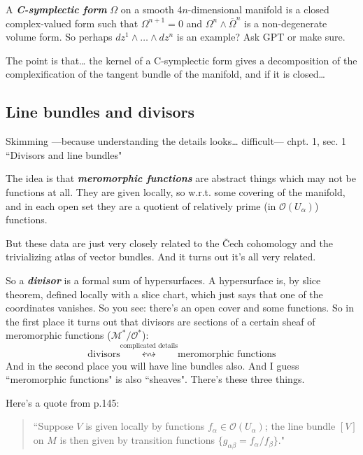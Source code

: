 A \textit{\textbf{C-symplectic form}} \(\Omega\) on a smooth 4\(n\)-dimensional manifold is a closed complex-valued form such that \(\Omega^{n+1}=0\) and \(\Omega^n \wedge \overline{ \Omega}^n\) is a non-degenerate volume form. So perhaps \(dz^1 \wedge \ldots \wedge dz^n\) is an example? Ask GPT or make sure.

The point is that… the kernel of a C-symplectic form gives a decomposition of the complexification of the tangent bundle of the manifold, and if it is closed…

\subsection{Line bundles and divisors}

Skimming ---because understanding the details looks… difficult--- \cite{gri} chpt. 1, sec. 1 ``Divisors and line bundles"

\begin{thing7}{The idea}\leavevmode
is that \textit{\textbf{meromorphic functions}} are abstract things which may not be functions at all. They are given locally, so w.r.t. some covering of the manifold, and in each open set they are a quotient of relatively prime (in \(\mathcal{O}(U_\alpha)\)) functions.

But these data are just very closely related to the Čech cohomology and the trivializing atlas of vector bundles. And it turns out it's all very related.

So a \textit{\textbf{divisor}} is a formal sum of hypersurfaces. A hypersurface is, by \cite{les} slice theorem, defined locally with a slice chart, which just says that one of the coordinates vanishes. So you see: there's an open cover and some functions. So in the first place it turns out that divisors are sections of a certain sheaf of meromorphic functions (\(\mathcal{M}^*/\mathcal{O}^*\)):
\[ \text{divisors} \overset{\text{complicated details} }{\leftrightsquigarrow}\text{meromorphic functions} \]
And in the second place you will have line bundles also. And I guess ``meromorphic functions" is also ``sheaves". There's these three things.

Here's a quote from \cite{gri} p.145:
\begin{quotation}
	``Suppose \(V\) is given locally by functions \(f_\alpha \in \mathcal{O}(U_\alpha)\); the line bundle \([V]\) on \(M\) is then given by transition functions \(\{g_{\alpha \beta}=f_\alpha/f_\beta\}\)."
\end{quotation}

\end{thing7}



